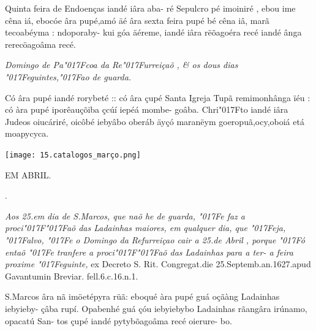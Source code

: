 \documentclass[openany,titlepage,12pt]{book}
\newcommand{\lgS}{\char"017F}
\newcommand{\lgSS}{\char"017F\char"017F}
\begin{document}
{\hspace*{-2ex}Quinta feira de Endoenças iandé iâra aba-
ré Sepulcro pé imoiniré , ebou ime cêna iá,
ebocóe âra pupé,amó äé âra sexta feira pupé
bé cêna iâ, marã tecoabéyma : ndoporaby-
kui góa äéreme, iandé iâra rëõagoéra recé
iandé ânga rerecöagoâma recé.}

\begin{center}
    \textit{\small Domingo de Pa\lgS coa da Re\lgS urreiçaõ , \& os dous
    dias \lgS eguintes,\lgS ao de guarda.}    
\end{center}

{\hspace*{-2ex}Có âra pupé iandé rorybeté :: có âra çupé
Santa Igreja Tupã remimonhânga ïéu : có
àra pupé iporêauçõiba çcúí iepéá mombe-
goâba. Chri\lgS to  iandé iâra Judeos oiucáriré,
oicôbé iebyâbo oberáb äyçó maranëym
goeropuã,ocy,oboiá etá moapycyca.}
\begin{center}
    \texttt{[image: 15.catalogos\_março.png]}
\end{center}
\newpage

\begin{center}
    {EM ABRIL.\\}
\end{center}
\hspace*{0ex}\begin{minipage}[t]{2ex}
.
\end{minipage}
\hspace*{1ex}\begin{minipage}[t]{0.92\linewidth}
    \textit{
    \footnotesize \hspace*{-3ex}Aos 25.em dia de S.Marcos, que naõ he de guarda,\linebreak
    \lgS e faz a proci\lgSS aõ das Ladainhas maiores, em
    qualquer dia, que \lgS eja, \lgS alvo, \lgS e o Domingo da
    Refurreiçao cair a 25.de Abril , porque \lgS ó entaõ\linebreak
    \lgS e tranfere a proci\lgSS aõ das Ladainhas para a ter-\linebreak
    a feira proxime \lgS eguinte,} {\small ex Decreto S. Rit.
    Congregat.die 25.Septemb.an.1627.apud
    Gavantumin Breviar. fell.6.c.16.n.1.}
    \newline\vspace*{4pt}
\end{minipage}

{\hspace*{-2ex}S.Marcos âra nã imöetépyra rüã: eboqué
àra pupé guá oçãàng Ladainhas iebyieby-
çâba rupí. Opabenhé guá çóu iebyiebybo
Ladainhas rãangâra irúnamo, opacatú San-
tos çupé iandé pytybõagoâma recé oierure-
bo.}
\end{document}
